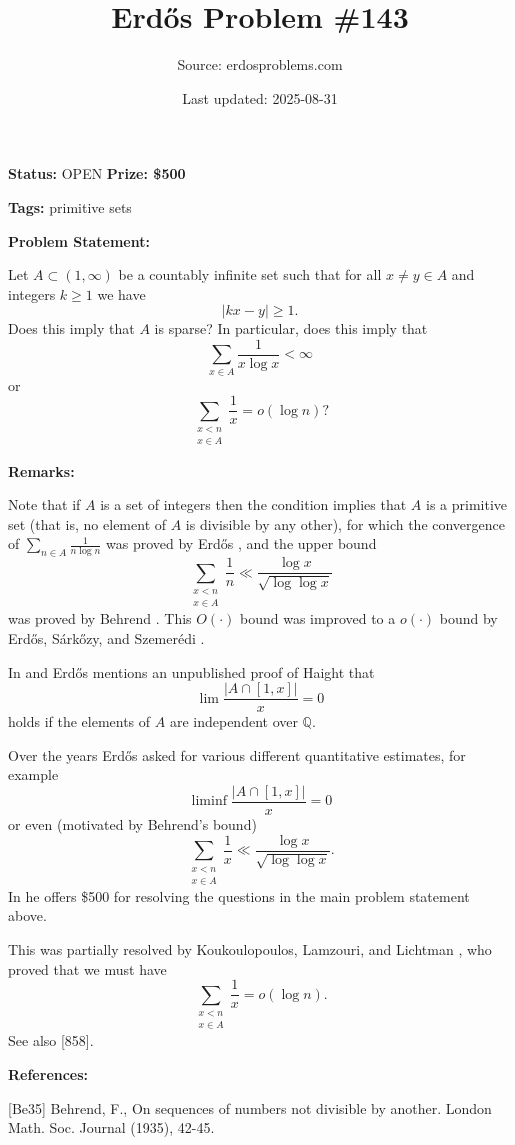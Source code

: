 \documentclass{article}
\title{Erd\H{o}s Problem \#143}
\date{Last updated: 2025-08-31}
\author{Source: erdosproblems.com}
\begin{document}
\maketitle

\noindent\textbf{Status:} OPEN \quad \textbf{Prize: \$500}

\noindent\textbf{Tags:} primitive sets

\medskip
\noindent\textbf{Problem Statement:}

Let $A\subset (1,\infty)$ be a countably infinite set such that for all $x\neq y\in A$ and integers $k\geq 1$ we have\[ \lvert kx -y\rvert \geq 1.\]Does this imply that $A$ is sparse? In particular, does this imply that\[\sum_{x\in A}\frac{1}{x\log x}<\infty\]or\[\sum_{\substack{x <n\\ x\in A}}\frac{1}{x}=o(\log n)?\]

\bigskip
\noindent\textbf{Remarks:}

Note that if $A$ is a set of integers then the condition implies that $A$ is a primitive set (that is, no element of $A$ is divisible by any other), for which the convergence of $\sum_{n\in A}\frac{1}{n\log n}$ was proved by Erd\H{o}s \cite{Er35}, and the upper bound\[\sum_{\substack{x <n\\ x\in A}}\frac{1}{n}\ll \frac{\log x}{\sqrt{\log\log x}}\]was proved by Behrend \cite{Be35}. This $O(\cdot)$ bound was improved to a $o(\cdot)$ bound by Erd\H{o}s, S\'{a}rk\H{o}zy, and Szemer\'{e}di \cite{ESS67}.

In \cite{Er73} and \cite{Er77c} Erd\H{o}s mentions an unpublished proof of Haight that\[\lim \frac{\lvert A\cap [1,x]\rvert}{x}=0\]holds if the elements of $A$ are independent over $\mathbb{Q}$.

Over the years Erd\H{o}s asked for various different quantitative estimates, for example\[\liminf \frac{\lvert A\cap [1,x]\rvert}{x}=0\]or even (motivated by Behrend's bound)\[\sum_{\substack{x <n\\ x\in A}}\frac{1}{x}\ll \frac{\log x}{\sqrt{\log\log x}}.\]In \cite{Er97c} he offers \$500 for resolving the questions in the main problem statement above.

This was partially resolved by Koukoulopoulos, Lamzouri, and Lichtman \cite{KLL25}, who proved that we must have\[\sum_{\substack{x <n\\ x\in A}}\frac{1}{x}=o(\log n).\]See also [858].

\bigskip
\noindent\textbf{References:}

[Be35] Behrend, F., On sequences of numbers not divisible by another. London Math. Soc. Journal (1935), 42-45.
 
\end{document}
